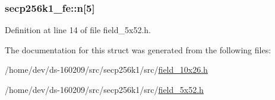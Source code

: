 \subsubsection[{n}]{ secp256k1\+\_\+fe\+::n\mbox{[}5\mbox{]}}\label{structsecp256k1__fe_a8159e965048d322e1ac8ee81060c535a}


Definition at line 14 of file field\+\_\+5x52.\+h.



The documentation for this struct was generated from the following files\+:\begin{DoxyCompactItemize}
\item 
/home/dev/ds-\/160209/src/secp256k1/src/\hyperlink{field__10x26_8h}{field\+\_\+10x26.\+h}\item 
/home/dev/ds-\/160209/src/secp256k1/src/\hyperlink{field__5x52_8h}{field\+\_\+5x52.\+h}\end{DoxyCompactItemize}
